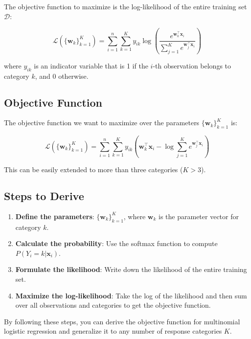 \documentclass[12pt]{article}
\begin{document}
\begin{enumerate}
The objective function to maximize is the log-likelihood of the entire training set \(\mathcal{D}\):

\begin{equation}
\mathcal{L}(\{\mathbf{w}_k\}_{k=1}^K) = \sum_{i=1}^n \sum_{k=1}^K y_{ik} \log \left( \frac{e^{\mathbf{w}_k^\top \mathbf{x}_i}}{\sum_{j=1}^K e^{\mathbf{w}_j^\top \mathbf{x}_i}} \right)
\end{equation}

where \( y_{ik} \) is an indicator variable that is 1 if the \( i \)-th observation belongs to category \( k \), and 0 otherwise.

\subsection*{Objective Function}

The objective function we want to maximize over the parameters \(\{\mathbf{w}_k\}_{k=1}^K\) is:

\begin{equation}
\mathcal{L}(\{\mathbf{w}_k\}_{k=1}^K) = \sum_{i=1}^n \sum_{k=1}^K y_{ik} \left( \mathbf{w}_k^\top \mathbf{x}_i - \log \sum_{j=1}^K e^{\mathbf{w}_j^\top \mathbf{x}_i} \right)
\end{equation}

This can be easily extended to more than three categories (\( K > 3 \)).

\subsection*{Steps to Derive}

\begin{enumerate}
    \item \textbf{Define the parameters}: \(\{\mathbf{w}_k\}_{k=1}^K\), where \(\mathbf{w}_k\) is the parameter vector for category \( k \).
    \item \textbf{Calculate the probability}: Use the softmax function to compute \( P(Y_i = k | \mathbf{x}_i) \).
    \item \textbf{Formulate the likelihood}: Write down the likelihood of the entire training set.
    \item \textbf{Maximize the log-likelihood}: Take the log of the likelihood and then sum over all observations and categories to get the objective function.
\end{enumerate}

By following these steps, you can derive the objective function for multinomial logistic regression and generalize it to any number of response categories \( K \).


\end{enumerate}
\end{document}
